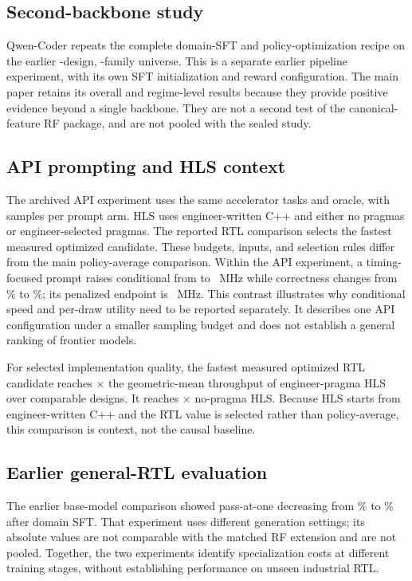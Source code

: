 \subsection{Second-backbone study}
Qwen-Coder repeats the complete domain-SFT and policy-optimization recipe on
the earlier -design,
-family universe. This is a separate earlier pipeline
experiment, with its own SFT initialization and reward configuration. The main
paper retains its overall and regime-level results because they provide
positive evidence beyond a single backbone. They are not a second test of the
canonical-feature RF package, and are not pooled with the sealed study.

\subsection{API prompting and HLS context}
The archived API experiment uses the same accelerator tasks and oracle, with
 samples per prompt arm. HLS uses engineer-written
C++ and either no pragmas or engineer-selected pragmas. The reported RTL
comparison selects the fastest measured optimized candidate. These budgets,
inputs, and selection rules differ from the main policy-average comparison.
Within the API experiment, a timing-focused prompt raises conditional \fmax{} from
 to
~MHz while correctness changes from
\% to
\%; its penalized endpoint is
~MHz. This contrast illustrates why conditional
speed and per-draw utility need to be reported separately. It describes one API
configuration under a smaller sampling budget and does not establish a general
ranking of frontier models.

For selected implementation quality, the fastest measured optimized RTL
candidate reaches $\times$ the geometric-mean
throughput of engineer-pragma HLS over  comparable
designs.  It reaches $\times$ no-pragma HLS.  Because HLS
starts from engineer-written C++ and the RTL value is selected rather than
policy-average, this comparison is context, not the causal baseline.
\subsection{Earlier general-RTL evaluation}
The earlier base-model comparison showed pass-at-one decreasing from
\% to \% after domain SFT.
That experiment uses different generation settings; its absolute values are
not comparable with the matched RF extension and are not pooled.  Together,
the two experiments identify specialization costs at different training stages,
without establishing performance on unseen industrial RTL.
